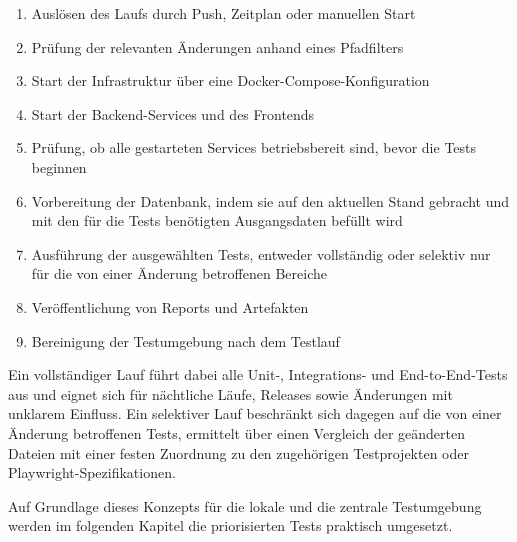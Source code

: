 \begin{enumerate}
\item Auslösen des Laufs durch Push, Zeitplan oder manuellen Start
\item Prüfung der relevanten Änderungen anhand eines Pfadfilters
\item Start der Infrastruktur über eine Docker-Compose-Konfiguration
\item Start der Backend-Services und des Frontends
\item Prüfung, ob alle gestarteten Services betriebsbereit sind, bevor die Tests beginnen
\item Vorbereitung der Datenbank, indem sie auf den aktuellen Stand gebracht und mit den für die Tests benötigten Ausgangsdaten befüllt wird
\item Ausführung der ausgewählten Tests, entweder vollständig oder selektiv nur für die von einer Änderung betroffenen Bereiche
\item Veröffentlichung von Reports und Artefakten
\item Bereinigung der Testumgebung nach dem Testlauf
\end{enumerate}

Ein vollständiger Lauf führt dabei alle Unit-, Integrations- und End-to-End-Tests aus und eignet sich für nächtliche Läufe, Releases sowie Änderungen mit unklarem Einfluss. Ein selektiver Lauf beschränkt sich dagegen auf die von einer Änderung betroffenen Tests, ermittelt über einen Vergleich der geänderten Dateien mit einer festen Zuordnung zu den zugehörigen Testprojekten oder Playwright-Spezifikationen.

Auf Grundlage dieses Konzepts für die lokale und die zentrale Testumgebung werden im folgenden Kapitel die priorisierten Tests praktisch umgesetzt.